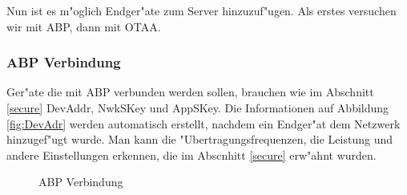 Nun ist es m"oglich Endger"ate zum Server hinzuzuf"ugen. Als erstes versuchen wir mit ABP, dann mit OTAA.
\vspace{10cm}
\subsubsection{ABP Verbindung}
Ger"ate die mit ABP verbunden werden sollen, brauchen wie im Abschnitt \ref{secure} DevAddr, NwkSKey und AppSKey.
Die Informationen auf Abbildung \ref{fig:DevAdr} werden automatisch erstellt, nachdem ein Endger"at dem Netzwerk hinzugef"ugt wurde. Man kann die "Ubertragungsfrequenzen, die Leistung und andere Einstellungen erkennen, die im Abscnhitt \ref{secure} erw"ahnt wurden. 
	\begin{figure}[h!]
	\centering
	\caption{ABP Verbindung}
	\end{figure}

